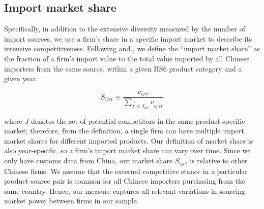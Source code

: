 \subsection{Import market share}

Specifically, in addition to the extensive diversity measured by the number of import sources, we use a firm's share in a specific import market to describe its intensive competitiveness. Following \cite{aik2014} and \cite{devereux2017}, we define the ``import market share'' as the fraction of a firm's import value to the total value imported by all Chinese importers from the same source, within a given HS6 product category and a given year. 

$$
S_{ijct} \equiv \frac{v_{ijct}}{\sum_{j^{\prime} \in J_{ict}} v_{ij^{\prime}ct}}
$$

where $J$ denotes the set of potential competitors in the same product-specific market; therefore, from the definition, a single firm can have multiple import market shares for different imported products. Our definition of market share is also year-specific, so a firm’s import market share can vary over time. Since we only have customs data from China, our market share $S_{ijct}$ is relative to other Chinese firms. We assume that the external competitive stance in a particular product-source pair is common for all Chinese importers purchasing from the same country. Hence, our measure captures all relevant variations in sourcing market power between firms in our sample.

